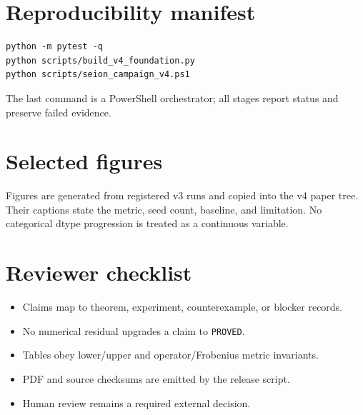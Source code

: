 \documentclass[10pt]{article}
\begin{document}
\section{Reproducibility manifest}
\begin{verbatim}
python -m pytest -q
python scripts/build_v4_foundation.py
python scripts/seion_campaign_v4.ps1
\end{verbatim}
    The last command is a PowerShell orchestrator; all stages report status and preserve failed evidence.
\section{Selected figures}
Figures are generated from registered v3 runs and copied into the v4 paper tree. Their captions state the metric, seed count, baseline, and limitation. No categorical dtype progression is treated as a continuous variable.
\section{Reviewer checklist}
\begin{itemize}
\item Claims map to theorem, experiment, counterexample, or blocker records.
\item No numerical residual upgrades a claim to \texttt{PROVED}.
\item Tables obey lower/upper and operator/Frobenius metric invariants.
\item PDF and source checksums are emitted by the release script.
\item Human review remains a required external decision.
\end{itemize}
\end{document}
